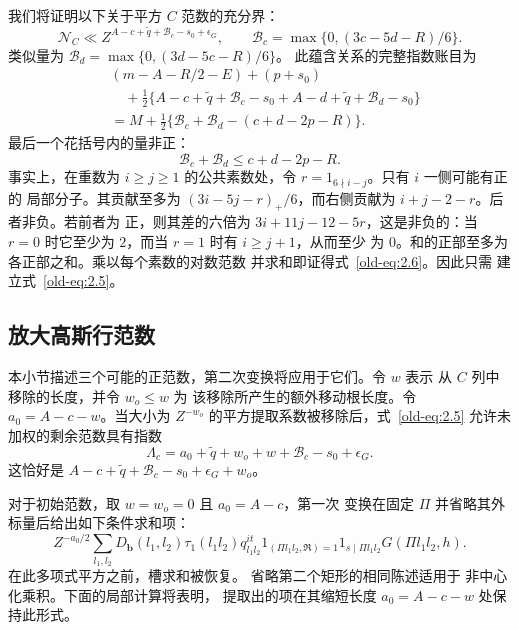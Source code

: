 \documentclass[11pt,a4paper]{article}
\numberwithin{equation}{section}
\numberwithin{figure}{section}
\theoremstyle{definition}
\theoremstyle{remark}
\begin{document}
我们将证明以下关于平方 \(C\) 范数的充分界：
\begin{equation}
 \mathcal N_C\ll
 Z^{A-c+\widetilde q+\mathcal B_c-s_0+\epsilon_G},
 \qquad
 \mathcal B_c=\max\{0,(3c-5d-R)/6\}.
 \label{old-eq:2.5}
\end{equation}
类似量为
\(\mathcal B_d=\max\{0,(3d-5c-R)/6\}\)。
此蕴含关系的完整指数账目为
\[
 \begin{aligned}
 &(m-A-R/2-E)+(p+s_0)\\
 &\quad+\tfrac12\{A-c+\widetilde q+\mathcal B_c-s_0
                  +A-d+\widetilde q+\mathcal B_d-s_0\}\\
 &=M+\tfrac12\{\mathcal B_c+\mathcal B_d-(c+d-2p-R)\}.
 \end{aligned}
\]
最后一个花括号内的量非正：
\begin{equation}
 \mathcal B_c+\mathcal B_d\le c+d-2p-R.
 \label{old-eq:2.6}
\end{equation}
事实上，在重数为 \(i\ge j\ge1\) 的公共素数处，令
\(r=1_{6\nmid i-j}\)。只有 \(i\) 一侧可能有正的
局部分子。其贡献至多为
\((3i-5j-r)_+/6\)，而右侧贡献为
\(i+j-2-r\)。后者非负。若前者为
正，则其差的六倍为
\(3i+11j-12-5r\)，这是非负的：当 \(r=0\) 时它至少为
\(2\)，而当 \(r=1\) 时有 \(i\ge j+1\)，从而至少
为 \(0\)。和的正部至多为各正部之和。乘以每个素数的对数范数
并求和即证得式~\eqref{old-eq:2.6}。因此只需
建立式~\eqref{old-eq:2.5}。

\subsection{放大高斯行范数}\label{sec:plain-gauss-enlargement}

本小节描述三个可能的正范数，第二次变换将应用于它们。令 \(w\) 表示
从 \(C\) 列中移除的长度，并令 \(w_o\le w\) 为
该移除所产生的额外移动根长度。令
\(a_0=A-c-w\)。当大小为
\(Z^{-w_o}\) 的平方提取系数被移除后，式~\eqref{old-eq:2.5}
允许未加权的剩余范数具有指数
\begin{equation}
 \Lambda_c=
 a_0+\widetilde q+w_o+w+\mathcal B_c-s_0+\epsilon_G.
 \label{old-eq:2.7}
\end{equation}
这恰好是 \(A-c+\widetilde q+\mathcal B_c-s_0+\epsilon_G+w_o\)。

对于初始范数，取 \(w=w_o=0\) 且 \(a_0=A-c\)，第一次
变换在固定 \(\Pi\) 并省略其外标量后给出如下条件求和项：
\begin{equation}
 Z^{-a_0/2}\sum_{l_1,l_2}
 D_{\mathbf b}(l_1,l_2)\tau_1(l_1l_2)q_{l_1l_2}^{it}
 1_{(\Pi l_1l_2,\mathfrak R)=1}1_{s\mid\Pi l_1l_2}
 G(\Pi l_1l_2,h).
 \label{old-eq:2.18c}
\end{equation}
在此多项式平方之前，槽求和被恢复。
省略第二个矩形的相同陈述适用于
非中心化乘积。下面的局部计算将表明，
提取出的项在其缩短长度 \(a_0=A-c-w\) 处保持此形式。
\end{document}
